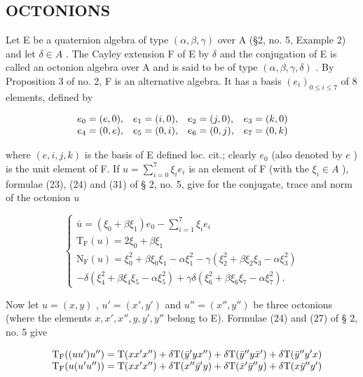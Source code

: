 \subsection{OCTONIONS}

Let E be a quaternion algebra of type \((\alpha, \beta, \gamma)\) over A (§2, no. 5, Example 2) and let \(\delta \in A\) . The Cayley extension F of E by \(\delta\) and the conjugation of E is called an octonion algebra over A and is said to be of type \((\alpha, \beta, \gamma, \delta)\) . By Proposition 3 of no. 2, F is an alternative algebra. It has a basis \((e_{i})_{0 \leq i \leq 7}\) of 8 elements, defined by

\[
\begin{array}{l l l l} e _ {0} = (e, 0), & e _ {1} = (i, 0), & e _ {2} = (j, 0), & e _ {3} = (k, 0) \\ e _ {4} = (0, e), & e _ {5} = (0, i), & e _ {6} = (0, j), & e _ {7} = (0, k) \end{array}
\]

where \((e, i, j, k)\) is the basis of E defined loc. cit.; clearly \(e_0\) (also denoted by \(e\) ) is the unit element of F. If \(u = \sum_{i=0}^{7} \xi_i e_i\) is an element of F (with the \(\xi_i \in A\) ), formulae (23), (24) and (31) of § 2, no. 5, give for the conjugate, trace and norm of the octonion \(u\)

\[
\left\{ \begin{array}{c} \bar {u} = (\xi_ {0} + \beta \xi_ {1}) e _ {0} - \sum_ {i = 1} ^ {7} \xi_ {i} e _ {i} \\ \mathrm{T} _ {\mathrm{F}} (u) = 2 \xi_ {0} + \beta \xi_ {1} \\ \mathrm{N} _ {\mathrm{F}} (u) = \xi_ {0} ^ {2} + \beta \xi_ {0} \xi_ {1} - \alpha \xi_ {1} ^ {2} - \gamma (\xi_ {2} ^ {2} + \beta \xi_ {2} \xi_ {3} - \alpha \xi_ {3} ^ {2}) \\ - \delta (\xi_ {4} ^ {2} + \beta \xi_ {4} \xi_ {5} - \alpha \xi_ {5} ^ {2}) + \gamma \delta (\xi_ {6} ^ {2} + \beta \xi_ {6} \xi_ {7} - \alpha \xi_ {7} ^ {2}). \end{array} \right.\tag{4}
\]

Now let \(u = (x, y)\) , \(u' = (x', y')\) and \(u'' = (x'', y'')\) be three octonions (where the elements \(x, x', x'', y, y', y''\) belong to E). Formulae (24) and (27) of § 2, no. 5 give

\[
\begin{array}{r l} & {\mathrm{T} _ {\mathrm{F}} ((u u ^ {\prime}) u ^ {\prime \prime}) = \mathrm{T} (x x ^ {\prime} x ^ {\prime \prime}) + \delta \mathrm{T} (\bar {y} ^ {\prime} y x ^ {\prime \prime}) + \delta \mathrm{T} (\bar {y} ^ {\prime \prime} y \bar {x} ^ {\prime}) + \delta \mathrm{T} (\bar {y} ^ {\prime \prime} y ^ {\prime} x)} \\ & {\mathrm{T} _ {\mathrm{F}} (u (u ^ {\prime} u ^ {\prime \prime})) = \mathrm{T} (x x ^ {\prime} x ^ {\prime \prime}) + \delta \mathrm{T} (x ^ {\prime \prime} \bar {y} ^ {\prime} y) + \delta \mathrm{T} (\bar {x} ^ {\prime} \bar {y} ^ {\prime \prime} y) + \delta \mathrm{T} (x \bar {y} ^ {\prime \prime} y ^ {\prime})} \end{array}
\]

